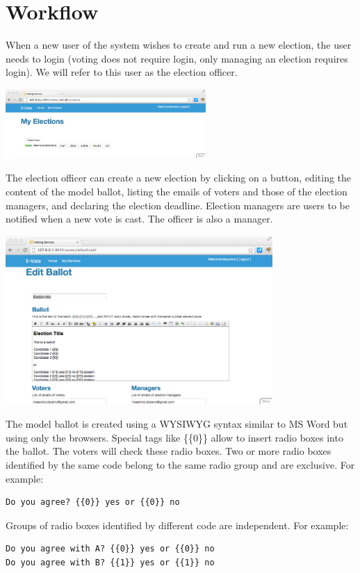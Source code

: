 \documentclass[12pt]{article}
\begin{document}
\section{Workflow}

When a new user of the system wishes to create and run a new election, the user needs to login (voting does not require login, only managing an election requires login). We will refer to this user as the election officer.
\begin{center}
\includegraphics[width=3in]{images/elections.png}
\end{center}
The election officer can create a new election by clicking on a button, editing the content of the model ballot, listing the emails of voters and those of the election managers, and declaring the election deadline. Election managers are users to be notified when a new vote is cast. The officer is also a manager.
\begin{center}
\includegraphics[width=4in]{images/edit.png}
\end{center}
The model ballot is created using a WYSIWYG syntax similar to MS Word but using only the browsers. Special tags like \{\{0\}\} allow to insert radio boxes into the ballot. The voters will check these radio boxes. Two or more radio boxes identified by the same code belong to the same radio group and are exclusive. For example:
\begin{verbatim}
Do you agree? {{0}} yes or {{0}} no
\end{verbatim}
Groups of radio boxes identified by different code are independent. For example:
\begin{verbatim}
Do you agree with A? {{0}} yes or {{0}} no
Do you agree with B? {{1}} yes or {{1}} no
\end{verbatim}
\end{document}
